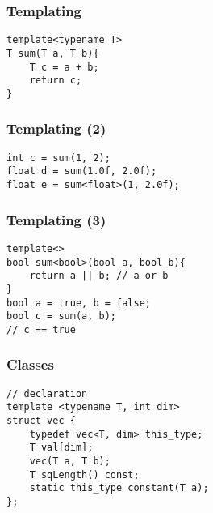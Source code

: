 
\begin{frame}
\end{frame}

\begin{frame}[fragile]
\frametitle{Templating}
\begin{lstlisting}
template<typename T>
T sum(T a, T b){
    T c = a + b;
    return c;
}
\end{lstlisting}
\end{frame}

\begin{frame}[fragile]
\frametitle{Templating (2)}
\begin{lstlisting}
int c = sum(1, 2);
float d = sum(1.0f, 2.0f);
float e = sum<float>(1, 2.0f);
\end{lstlisting}
\end{frame}

\begin{frame}[fragile]
\frametitle{Templating (3)}
\begin{lstlisting}
template<>
bool sum<bool>(bool a, bool b){
    return a || b; // a or b
}
bool a = true, b = false;
bool c = sum(a, b);
// c == true
\end{lstlisting}
\end{frame}

\begin{frame}
\end{frame}

\begin{frame}[fragile]
\frametitle{Classes}
\begin{lstlisting}
// declaration
template <typename T, int dim>
struct vec {
    typedef vec<T, dim> this_type;
    T val[dim];
    vec(T a, T b);
    T sqLength() const;
    static this_type constant(T a);
};
\end{lstlisting}
\end{frame}

